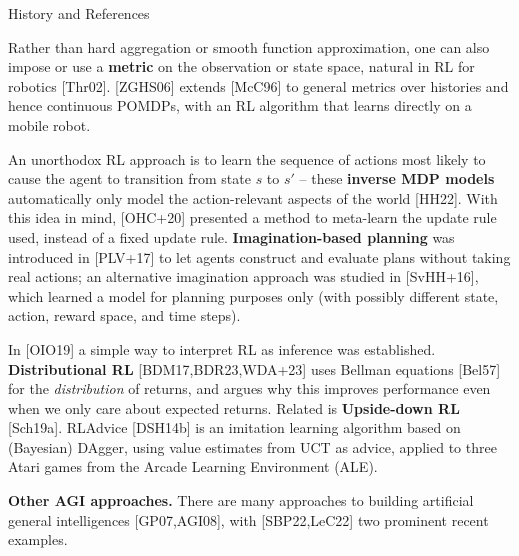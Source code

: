 \documentclass[aspectratio=169,10pt]{beamer}
\begin{document}
\begin{frame}[allowframebreaks]{History and References}
  \framebreak

  Rather than hard aggregation or smooth function approximation, one can
  also impose or use a \textbf{metric} on the observation or state space,
  natural in RL for robotics [Thr02]. [ZGHS06] extends [McC96] to general
  metrics over histories and hence continuous POMDPs, with an RL algorithm
  that learns directly on a mobile robot.

  \vspace{0.4em}
  An unorthodox RL approach is to learn the sequence of actions most
  likely to cause the agent to transition from state $s$ to $s'$ -- these
  \textbf{inverse MDP models} automatically only model the
  action-relevant aspects of the world [HH22]. With this idea in mind,
  [OHC+20] presented a method to meta-learn the update rule used, instead
  of a fixed update rule. \textbf{Imagination-based planning} was
  introduced in [PLV+17] to let agents construct and evaluate plans
  without taking real actions; an alternative imagination approach was
  studied in [SvHH+16], which learned a model for planning purposes only
  (with possibly different state, action, reward space, and time steps).

  \framebreak

  In [OIO19] a simple way to interpret RL as inference was established.
  \textbf{Distributional RL} [BDM17,BDR23,WDA+23] uses Bellman equations
  [Bel57] for the \emph{distribution} of returns, and argues why this
  improves performance even when we only care about expected returns.
  Related is \textbf{Upside-down RL} [Sch19a]. RLAdvice [DSH14b] is an
  imitation learning algorithm based on (Bayesian) DAgger, using value
  estimates from UCT as advice, applied to three Atari games from the
  Arcade Learning Environment (ALE).

  \vspace{0.4em}
  \textbf{Other AGI approaches.} There are many approaches to building
  artificial general intelligences [GP07,AGI08], with [SBP22,LeC22] two
  prominent recent examples.
\end{frame}
\end{document}
